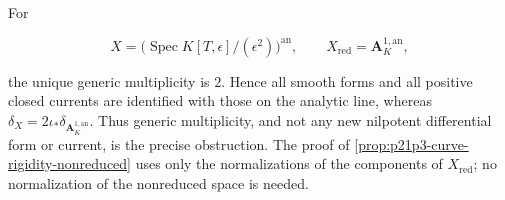 \begin{remark}
\label{rem:p21p3-nr-double-line}
For

\[
 X=\bigl(\operatorname{Spec}K[T,\epsilon]/(\epsilon^2)\bigr)^{\mathrm{an}},
 \qquad X_{\mathrm{red}}=\mathbf A_K^{1,\mathrm{an}},
\]

the unique generic multiplicity is \(2\).  Hence all smooth forms and all
positive closed currents are identified with those on the analytic line,
whereas
\(\delta_X=2\iota_*\delta_{\mathbf A_K^{1,\mathrm{an}}}\).
Thus generic multiplicity, and not any new nilpotent differential form or
current, is the precise obstruction.  The proof of
\cref{prop:p21p3-curve-rigidity-nonreduced} uses only the normalizations of
the components of \(X_{\mathrm{red}}\); no normalization of the
nonreduced space is needed.
\end{remark}
